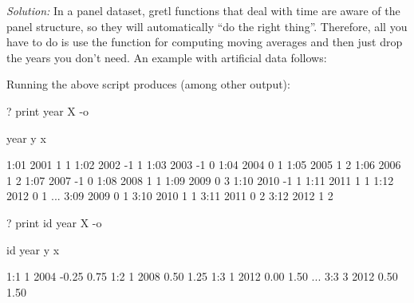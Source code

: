 \emph{Solution:} In a panel dataset, gretl functions that deal
with time are aware of the panel structure, so they will automatically
``do the right thing''. Therefore, all you have to do is use the
 function for computing moving averages and then just
drop the years you don't need. An example with artificial data
follows:
Running the above script produces (among other output):
\begin{code}
? print year X -o

             year            y            x

1:01         2001            1            1
1:02         2002           -1            1
1:03         2003           -1            0
1:04         2004            0            1
1:05         2005            1            2
1:06         2006            1            2
1:07         2007           -1            0
1:08         2008            1            1
1:09         2009            0            3
1:10         2010           -1            1
1:11         2011            1            1
1:12         2012            0            1
...
3:09         2009            0            1
3:10         2010            1            1
3:11         2011            0            2
3:12         2012            1            2

? print id year X -o

              id         year            y            x

1:1            1         2004        -0.25         0.75
1:2            1         2008         0.50         1.25
1:3            1         2012         0.00         1.50
...
3:3            3         2012         0.50         1.50
\end{code}

